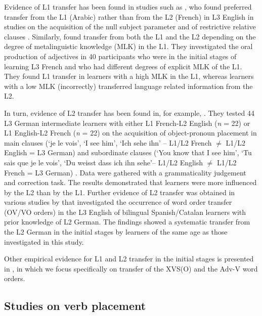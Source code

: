 \documentclass[output=paper]{langsci/langscibook}
\begin{document}
Evidence of L1 transfer has been found in studies such as \citep{Hermas2014Morphosyntax, Hermas2014Relatives}, who found preferred transfer from the L1 (Arabic) rather than from the L2 (French) in L3 English in studies on the acquisition of the null subject parameter \citep{Hermas2014Morphosyntax} and of restrictive relative clauses \citep{Hermas2014Relatives}. Similarly, \citet{FalkEtAl2015} found transfer from both the L1 and the L2 depending on the degree of metalinguistic knowledge (MLK) in the L1. They investigated the oral production of adjectives in 40 participants who were in the initial stages of learning L3 French and who had different degrees of explicit MLK of the L1. They found L1 transfer in learners with a high MLK in the L1, whereas learners with a low MLK (incorrectly) transferred language related information from the L2.

In turn, evidence of L2 transfer has been found in, for example, \citet{FalkBardel2011}. They tested 44 L3 German intermediate learners with either L1 French-L2 English (\textit{n} = 22) or L1 English-L2 French (\textit{n} = 22) on the acquisition of object-pronoun placement in main clauses (‘je {le} vois’, ‘I see {him}’, ‘Ich sehe {ihn’} – L1/L2 French ${\neq}$ L1/L2 English = L3 German) and subordinate clauses (‘You know that I see {him}’, ‘Tu sais que je {le} vois’, ‘Du weisst dass ich {ihn} sehe’– L1/L2 English ${\neq}$ L1/L2 French = L3 German) \citep[60]{FalkBardel2011}. Data were gathered with a grammaticality judgement and correction task. The results demonstrated that learners were more influenced by the L2 than by the L1. Further evidence of L2 transfer was obtained in various studies by \citet{Sánchez2012, Sánchez2015, Sánchez2016} that investigated the occurrence of word order transfer (OV/VO orders) in the L3 English of bilingual Spanish/Catalan learners with prior knowledge of L2 German. The findings showed a systematic transfer from the L2 German in the initial stages by learners of the same age as those investigated in this study.

Other empirical evidence for L1 and L2 transfer in the initial stages is presented in , in which we focus specifically on transfer of the XVS(O) and the Adv-V word orders.

\subsection{{Studies} {on} {verb} {placement} }%
\label{sec:stadt:2.2}
\end{document}
